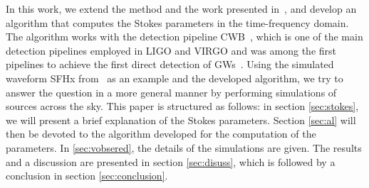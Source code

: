 \documentclass[aps,twocolumn,showpacs,groupedaddress, nofootinbib]{revtex4}  %
\begin{document}
In this work, we extend the method and the work presented in~\cite{hayama2016circular, hayama2018circular}, 
and develop an algorithm that computes the Stokes parameters in the time-frequency domain.
The algorithm works with the detection pipeline \ac{CWB}~\cite{2016PhRvD..93d2004K}, which 
is one of the main detection pipelines employed in LIGO and VIRGO and was among the first pipelines to achieve the first direct detection of \acp{GW}~\cite{abbott2016observing}.
Using the simulated waveform SFHx from~\cite{kuroda2016new} as an example and the developed algorithm, we
try to answer the question in a more general manner by performing simulations of sources across the sky.
This paper is structured as follows: in section \ref{sec:stokes}, we will present a brief explanation of the Stokes parameters.
Section \ref{sec:al} will then be devoted to the algorithm developed for the computation of the parameters. In \ref{sec:vobsered},
the details of the simulations are given. The results and a discussion are presented in section \ref{sec:disuss}, which is followed by a conclusion in section \ref{sec:conclusion}.




\end{document}
